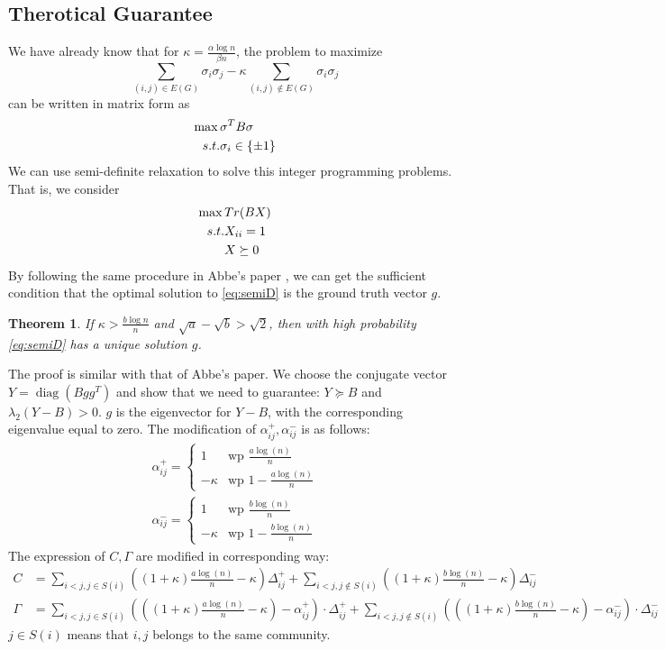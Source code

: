 \documentclass{ctexart}
\newtheorem{theorem}{Theorem}
\DeclareMathOperator{\diag}{diag}
\newcommand{\A}{\frac{a \log(n)}{n}}
\newcommand{\B}{\frac{b \log(n)}{n}}
\begin{document}
\subsection{Therotical Guarantee}
We have already know that for $\kappa = \frac{\alpha \log n}{\beta n}$, the problem to maximize
\begin{equation}
\sum_{(i,j)\in E(G)} \sigma_i \sigma_j - \kappa \sum_{(i,j) \not\in E(G)} \sigma_i \sigma_j
\end{equation}
can be written in matrix form
as 
\begin{align}
\max \, & \sigma^T B \sigma \label{eq:sigmaB}\\
s.t. & \sigma_i \in \{\pm 1\} \notag
\end{align}
We can use semi-definite relaxation to solve this integer programming problems.
That is, we consider
\begin{align}
\max \,& Tr(BX) \label{eq:semiD}\\
s.t. & X_{ii} = 1 \notag \\
&  X \succeq 0 \notag
\end{align}
By following the same procedure in Abbe's paper \cite{abbe2015exact}, we can get the sufficient condition that the optimal solution
to \eqref{eq:semiD} is the ground truth vector $g$.
\begin{theorem}
If $\kappa > \frac{b\log n}{n}$ and $\sqrt{a} - \sqrt{b} > \sqrt{2}$, then with high probability \eqref{eq:semiD} has a unique solution $g$.
\end{theorem}
The proof is similar with that of Abbe's paper. We choose the conjugate vector $Y=\diag(Bgg^T)$ and show that 
we need to guarantee:  $Y \succeq B$ and $\lambda_2(Y-B)>0$.
$g$ is the eigenvector for $Y-B$, with the corresponding eigenvalue equal to zero.
The modification of $\alpha_{ij}^+, \alpha_{ij}^-$ is as follows:
\begin{align}
\alpha^+_{ij}=\begin{cases} 1 & \text{wp }\A \\ -\kappa & \text{wp } 1-\A \end{cases}\\
\alpha^-_{ij}=\begin{cases} 1 & \text{wp }\B \\ -\kappa & \text{wp } 1-\B \end{cases}
\end{align}
The expression of $C, \Gamma$ are modified in corresponding way:
\begin{align}
C &=  \sum_{i<j, j \in S(i)}\left((1+\kappa)\A-\kappa\right)\Delta^+_{ij}+\sum_{i<j, j \notin S(i)} \left((1+\kappa)\B-\kappa\right) \Delta^-_{ij}\\
\Gamma &=  \sum_{i<j, j \in S(i)}\left(\left((1+\kappa)\A-\kappa\right) - \alpha^{+}_{ij}\right) \cdot \Delta^+_{ij} + \sum_{i<j, j \notin S(i)} \left(\left((1+\kappa)\B-\kappa\right) - \alpha^{-}_{ij}\right) \cdot \Delta^-_{ij}
\end{align}
$j\in S(i)$ means that $i,j$ belongs to the same community.
\end{document}
